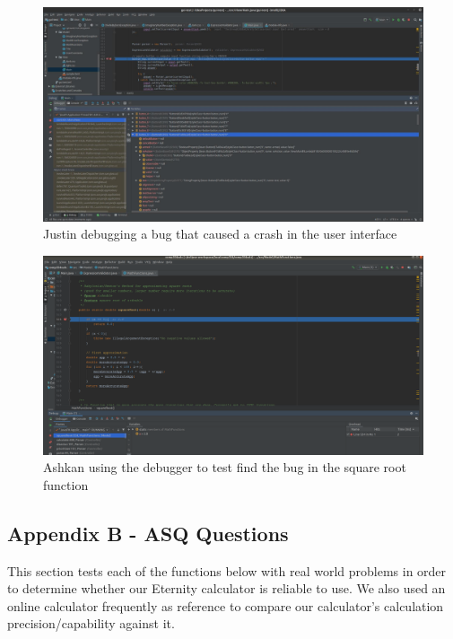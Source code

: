 \documentclass[a4paper, 12pt]{article}
\begin{document}
\vspace{20mm}
\begin{figure}[H]
\centering
\includegraphics[width=1.13\textwidth]{justin.jpg}
\caption{Justin debugging a bug that caused a crash in the user interface}
\label{Justin}
\end{figure}


\vspace{20mm}
\begin{figure}[H]
\centering
\includegraphics[width=1.13\textwidth]{Ashkan1.png}
\caption{Ashkan using the debugger to test find the bug in the square root function}
\label{Ashkan}
\end{figure}

\pagebreak

\subsection{Appendix B - ASQ Questions}

This section tests each of the functions below with real world problems in order to determine whether our Eternity calculator is reliable to use. We also used an online calculator frequently as reference to compare our calculator’s calculation precision/capability against it.
\\
\end{document}
